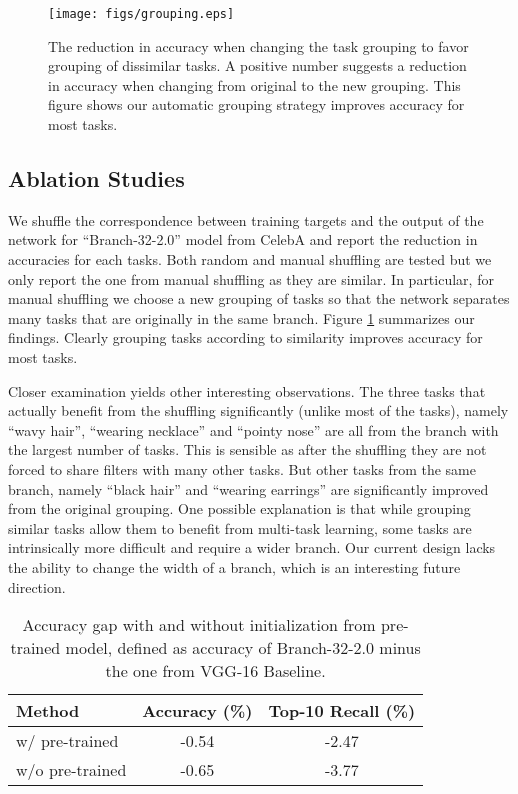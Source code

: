\documentclass[10pt,twocolumn,letterpaper]{article}
\begin{document}
\begin{figure}[t]
	\begin{center}
		\texttt{[image: figs/grouping.eps]}  
	\end{center}
	\caption{The reduction in accuracy when changing the task grouping to favor grouping of dissimilar tasks. A positive number suggests a reduction in accuracy when changing from original to the new grouping. This figure shows our automatic grouping strategy improves accuracy for most tasks. }
	\label{fig:task_group}
\end{figure}

\vspace{-1mm}
\subsection{Ablation Studies}
\vspace{-1mm}{\bf What are the advantages of grouping similar tasks?} We shuffle the correspondence between training targets and the output of the network for ``Branch-32-2.0'' model from CelebA and report the reduction in accuracies for each tasks. Both random and manual shuffling are tested but we only report the one from manual shuffling as they are similar. In particular, for manual shuffling we choose a new grouping of tasks so that the network separates many tasks that are originally in the same branch. Figure \ref{fig:task_group} summarizes our findings. Clearly grouping tasks according to similarity improves accuracy for most tasks. 

Closer examination yields other interesting observations. The three tasks that actually benefit from the shuffling significantly (unlike most of the tasks), namely ``wavy hair'', ``wearing necklace'' and ``pointy nose'' are all from the branch with the largest number of tasks. This is sensible as after the shuffling they are not forced to share filters with many other tasks. But other tasks from the same branch, namely ``black hair'' and ``wearing earrings'' are significantly improved from the original grouping. One possible explanation is that while grouping similar tasks allow them to benefit from multi-task learning, some tasks are intrinsically more difficult and require a wider branch. Our current design lacks the ability to change the width of a branch, which is an interesting future direction. 

\begin{table}
	\begin{center} \small
		\begin{tabular}{|l|c|c|}
			\hline
			\bf Method & \bf Accuracy (\%) & \bf Top-10 Recall (\%) \\ \hline
			w/ pre-trained & -0.54 &  -2.47 \\
			w/o pre-trained & -0.65 & -3.77  \\
			\hline
		\end{tabular}
	\end{center}
	\caption{Accuracy gap with and without initialization from pre-trained model, defined as accuracy of Branch-32-2.0 minus the one from VGG-16 Baseline.}
	\label{tab:capacity}
	\vspace{-4mm}
\end{table}
\end{document}
